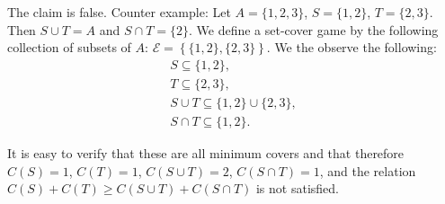 \documentclass{article}
\begin{document}
\section{}
The claim is false. Counter example: Let $A=\{1, 2, 3\}$, $S=\{1, 2\}$,
 $T=\{2, 3\}$. Then $S\cup T=A$ and $S\cap T=\{2\}$. We define a set-cover game by the 
following collection of subsets of $A$:
 $\mathcal{E}=\left\{\{1, 2\}, \{2, 3\}\right\}$. We the observe the following:
 \begin{eqnarray*}
   S\subseteq\{1, 2\},\\
   T\subseteq\{2, 3\},\\
   S\cup T\subseteq\{1, 2\} \cup  \{2, 3\},\\
   S\cap T\subseteq\{1, 2\}.
 \end{eqnarray*}

It is easy to verify that these are all minimum covers and that therefore
$C(S)=1$, $C(T)=1$, $C(S\cup T)=2$, $C(S\cap T)=1$, and the relation
$C(S)+C(T) \geq C(S\cup T)+C(S\cap T)$ is not satisfied.
\end{document}

